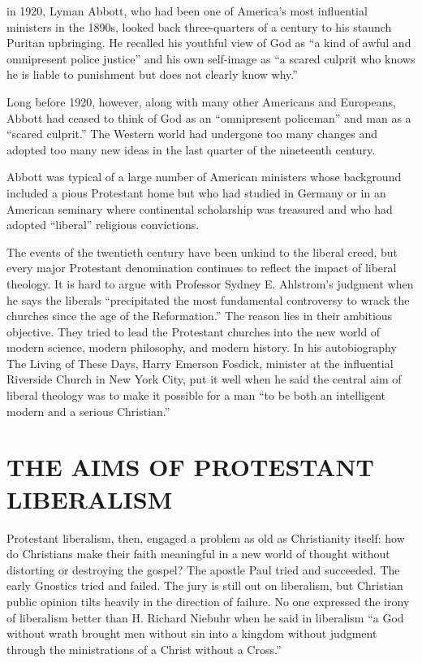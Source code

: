 
 in 1920, Lyman Abbott, who had been one of America’s most
influential ministers in the 1890s, looked back three-quarters of a century to his staunch Puritan
upbringing. He recalled his youthful view of God as “a kind of awful and omnipresent police justice”
and his own self-image as “a scared culprit who knows he is liable to punishment but does not
clearly know why.”

Long before 1920, however, along with many other Americans and Europeans, Abbott had ceased to think
of God as an “omnipresent policeman” and man as a “scared culprit.” The Western world had undergone
too many changes and adopted too many new ideas in the last quarter of the nineteenth century.

Abbott was typical of a large number of American ministers whose background included a pious
Protestant home but who had studied in Germany or in an American seminary where continental
scholarship was treasured and who had adopted “liberal” religious convictions.

The events of the twentieth century have been unkind to the liberal creed, but every major
Protestant denomination continues to reflect the impact of liberal theology. It is hard to argue
with Professor Sydney E. Ahlstrom’s judgment when he says the liberals “precipitated the most
fundamental controversy to wrack the churches since the age of the Reformation.” The reason lies in
their ambitious objective. They tried to lead the Protestant churches into the new world of modern
science, modern philosophy, and modern history. In his autobiography The Living of These Days, Harry
Emerson Fosdick, minister at the influential Riverside Church in New York City, put it well when he
said the central aim of liberal theology was to make it possible for a man “to be both an
intelligent modern and a serious Christian.”

\section{THE AIMS OF PROTESTANT LIBERALISM}

Protestant liberalism, then, engaged a problem as old as Christianity itself: how do Christians make
their faith meaningful in a new world of thought without distorting or destroying the gospel? The
apostle Paul tried and succeeded. The early Gnostics tried and failed. The jury is still out on
liberalism, but Christian public opinion tilts heavily in the direction of failure. No one expressed
the irony of liberalism better than H. Richard Niebuhr when he said in liberalism “a God without
wrath brought men without sin into a kingdom without judgment through the ministrations of a Christ
without a Cross.”


